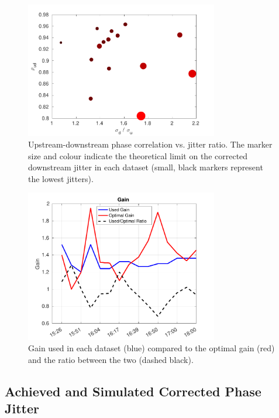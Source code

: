 \begin{figure}
  \centering
  \includegraphics[width=0.75\textwidth]{Figures/feedforward/longFF_corrVsJitRat}
  \caption{Upstream-downstream phase correlation vs. jitter ratio. The marker size and colour indicate the theoretical limit on the corrected downstream jitter in each dataset (small, black markers represent the lowest jitters).}
  \label{f:longFF_corrVsJitRat}
\end{figure}

\begin{figure}
  \centering
  \includegraphics[width=0.75\textwidth]{Figures/feedforward/longFF_gain}
  \caption{Gain used in each dataset (blue) compared to the optimal gain (red) and the ratio between the two (dashed black).}
  \label{f:longFF_gain}
\end{figure}



\subsection{Achieved and Simulated Corrected Phase Jitter}
\label{ss:longFF_singleResults}

